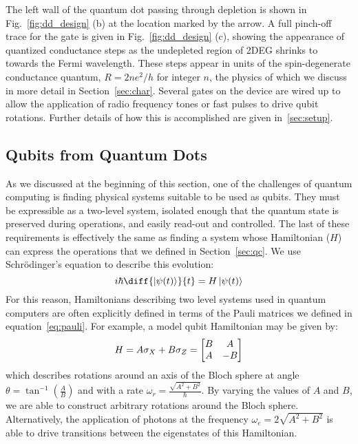 The left wall of the quantum dot passing through depletion is shown in Fig.~\ref{fig:dd_design} (b) at the
location marked by the arrow. A full pinch-off trace for the gate is given in Fig.~\ref{fig:dd_design} (c), showing the appearance of quantized
conductance steps as the undepleted region of 2DEG shrinks to towards the Fermi wavelength. These steps appear in units of the spin-degenerate conductance quantum,
$R = 2 n e^2/h$ for integer $n$, the physics of which we discuss in more detail in Section~\ref{sec:char}. Several gates on the device
are wired up to allow the application of radio frequency tones or fast pulses to drive qubit rotations.
Further details of how this is accomplished are given in~\ref{sec:setup}.

\subsection{Qubits from Quantum Dots}
As we discussed at the beginning of this section, one of the challenges of quantum computing is finding physical systems
suitable to be used as qubits. They must be expressible as a two-level system, isolated enough that the quantum state is
preserved during operations, and easily read-out and controlled. The last of these requirements is effectively the
same as finding a system whose Hamiltonian ($H$) can express the operations that we defined in Section~\ref{sec:qc}. We use
Schrödinger's equation to describe this evolution:
\begin{equation}
  i \hbar \diff{\ket{\psi(t)}}{t} = H \ket{\psi(t)}
\end{equation}
For this reason, Hamiltonians describing two level systems used in quantum computers are often explicitly defined in terms of
the Pauli matrices we defined in equation~\ref{eq:pauli}. For example, a model qubit Hamiltonian may be given by:
\begin{equation}
  H = A \sigma_X + B \sigma_Z = \begin{bmatrix}B&A\\A&-B\end{bmatrix}
\end{equation}
which describes rotations around an axis of the Bloch sphere at angle $\theta = \tan^{-1}\left(\tfrac{A}{B}\right)$ and with a rate
$\omega_r = \tfrac{\sqrt{A^2 + B^2}}{\hbar}$. By varying the values of $A$ and $B$, we are able to construct arbitrary
rotations around the Bloch sphere. Alternatively, the application of photons at the frequency
$\omega_e = 2\sqrt{A^2 + B^2}$ is able to drive transitions between the eigenstates of this Hamiltonian.


